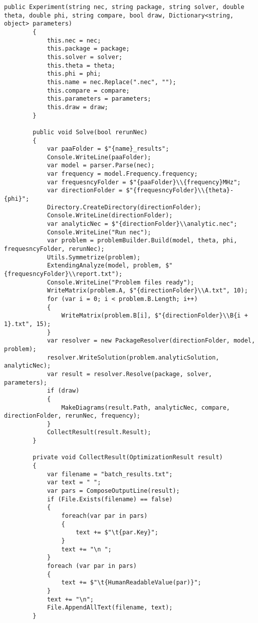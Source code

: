 \documentclass{scrartcl}
\begin{document}
\begin{lstlisting}[language={[Sharp]C}, caption={Experiment}, label={experiment}]
        public Experiment(string nec, string package, string solver, double theta, double phi, string compare, bool draw, Dictionary<string, object> parameters)
        {
            this.nec = nec;
            this.package = package;
            this.solver = solver;
            this.theta = theta;
            this.phi = phi;
            this.name = nec.Replace(".nec", "");
            this.compare = compare;
            this.parameters = parameters;
            this.draw = draw;
        }

        public void Solve(bool rerunNec)
        {
            var paaFolder = $"{name}_results";
            Console.WriteLine(paaFolder);
            var model = parser.Parse(nec);
            var frequency = model.Frequency.frequency;
            var frequesncyFolder = $"{paaFolder}\\{frequency}MHz";
            var directionFolder = $"{frequesncyFolder}\\{theta}-{phi}";
            Directory.CreateDirectory(directionFolder);
            Console.WriteLine(directionFolder);
            var analyticNec = $"{directionFolder}\\analytic.nec";
            Console.WriteLine("Run nec");
            var problem = problemBuilder.Build(model, theta, phi, frequesncyFolder, rerunNec);
            Utils.Symmetrize(problem);
            ExtendingAnalyze(model, problem, $"{frequesncyFolder}\\report.txt");
            Console.WriteLine("Problem files ready");
            WriteMatrix(problem.A, $"{directionFolder}\\A.txt", 10);
            for (var i = 0; i < problem.B.Length; i++)
            {
                WriteMatrix(problem.B[i], $"{directionFolder}\\B{i + 1}.txt", 15);
            }
            var resolver = new PackageResolver(directionFolder, model, problem);
            resolver.WriteSolution(problem.analyticSolution, analyticNec);
            var result = resolver.Resolve(package, solver, parameters);
            if (draw)
            {
                MakeDiagrams(result.Path, analyticNec, compare, directionFolder, rerunNec, frequency);
            }
            CollectResult(result.Result);
        }

        private void CollectResult(OptimizationResult result)
        {
            var filename = "batch_results.txt";
            var text = " ";
            var pars = ComposeOutputLine(result);
            if (File.Exists(filename) == false)
            {
                foreach(var par in pars)
                {
                    text += $"\t{par.Key}";
                }
                text += "\n ";
            }
            foreach (var par in pars)
            {
                text += $"\t{HumanReadableValue(par)}";
            }
            text += "\n";
            File.AppendAllText(filename, text);
        }


\end{lstlisting}
\end{document}

